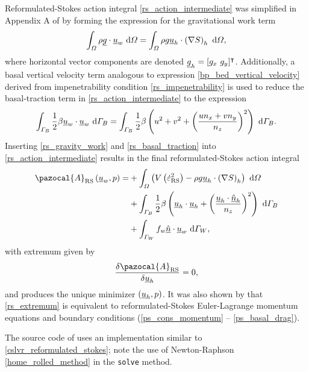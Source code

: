 Reformulated-Stokes action integral \cref{rs_action_intermediate} was simplified in Appendix A of \citet{dukowicz_2012} by forming the expression for the gravitational work term
\begin{align}
  \label{rs_gravity_work}
  \int_{\varOmega} \rho \underline{g} \cdot \underline{u}_w \ \mathrm{d}\varOmega = \int_{\varOmega} \rho g \underline{u}_h \cdot \left( \nabla S \right)_h \ \mathrm{d}\varOmega,
\end{align}
where horizontal vector components are denoted $\underline{g}_h = [g_x\ g_y]^\intercal$.  Additionally, a basal vertical velocity term analogous to expression \cref{bp_bed_vertical_velocity} derived from impenetrability condition \cref{rs_impenetrability} is used to reduce the basal-traction term in \cref{rs_action_intermediate} to the expression
{\footnotesize
\begin{align}
  \label{rs_basal_traction}
  \int_{\varGamma_B} \frac{1}{2} \beta \underline{u}_w \cdot \underline{u}_w \ \mathrm{d}\varGamma_B = \int_{\varGamma_B} \frac{1}{2} \beta \left( u^2 + v^2 + \left( \frac{u n_x + v n_y}{n_z} \right)^2 \right) \ \mathrm{d}\varGamma_B.
\end{align}}
Inserting \cref{rs_gravity_work} and \cref{rs_basal_traction} into \cref{rs_action_intermediate} results in the final reformulated-Stokes action integral
\begin{align}
  \label{rs_action}
  \pazocal{A}_{\text{RS}} \left(\rankone{u}_w, p\right) = &+ \int_{\Omega} \left( V\left( \dot{\varepsilon}_{\text{RS}}^2 \right) - \rho g \rankone{u}_h \cdot \left( \nabla S \right)_h \right) \d{\Omega} \notag \\
  &+ \int_{\Gamma_B} \frac{1}{2} \beta \left( \rankone{u}_h \cdot \rankone{u}_h + \left( \frac{\rankone{u}_h \cdot \normal_h}{n_z} \right)^2 \right) \d{\Gamma_B} \notag \\
  &+ \int_{\Gamma_W} f_w \normal \cdot \rankone{u}_w \d{\Gamma_W},
\end{align}
with extremum given by
\begin{align}
  \label{rs_extremum}
  \frac{\delta \pazocal{A}_{\text{RS}}}{\delta \rankone{u}_h} = 0,
\end{align}
and produces the unique minimizer $(\underline{u}_h, p)$.  It was also shown by \citet{dukowicz_2012} that \cref{rs_extremum} is equivalent to reformulated-Stokes Euler-Lagrange momentum equations and boundary conditions (\cref{ps_cons_momentum} -- \cref{ps_basal_drag}).

The source code of \CSLVR uses an implementation similar to \cref{cslvr_reformulated_stokes}; note the use of Newton-Raphson \cref{home_rolled_method} in the \texttt{solve} method.

